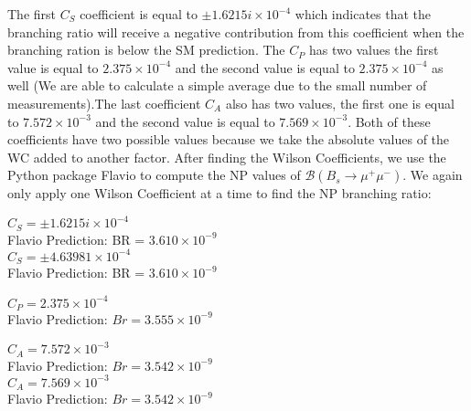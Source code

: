 \documentclass[12pt]{article}
\begin{document}
The first $C_S$ coefficient is equal to $\pm 1.6215i \times 10^{-4}$ which indicates that the branching ratio will receive a negative contribution from this coefficient when the branching ration is below the SM prediction. The $C_P$ has two values the first value is equal to $2.375\times 10^{-4}$ and the second value is equal to $2.375 \times 10^{-4}$ as well (We are able to calculate a simple average due to the small number of measurements).The last coefficient $C_{A}$ also has two values, the first one is equal to $7.572 \times 10^{-3}$ and the second value is equal to $7.569 \times 10^{-3}$. Both of these coefficients have two possible values because we take the  absolute values of the WC added to another factor. After finding the Wilson Coefficients, we use the Python package Flavio \cite{flavio} to compute the NP values of $\mathcal{B}(B_s\rightarrow \mu^+\mu^-)$. We again only apply one Wilson Coefficient at a time to find the NP branching ratio:
\begin{center}
 $C_S = \pm 1.6215i \times 10^{-4}$\\
 Flavio Prediction: BR = $3.610 \times 10^{-9}$\\
 $C_S = \pm 4.63981 \times 10^{-4}$\\
 Flavio Prediction: BR = $3.610 \times 10^{-9}$\\
\end{center}
\begin{center}
$C_{P} = 2.375 \times 10^{-4}$ \\
Flavio Prediction: $Br = 3.555 \times 10^{-9}$\\
\end{center}
\begin{center}
$C_{A} = 7.572 \times 10^{-3}$ \\
Flavio Prediction: $Br = 3.542 \times 10^{-9}$\\
$C_{A} = 7.569\times 10^{-3}$ \\
Flavio Prediction: $Br = 3.542 \times 10^{-9}$\\
\end{center}
\newpage
\end{document}

